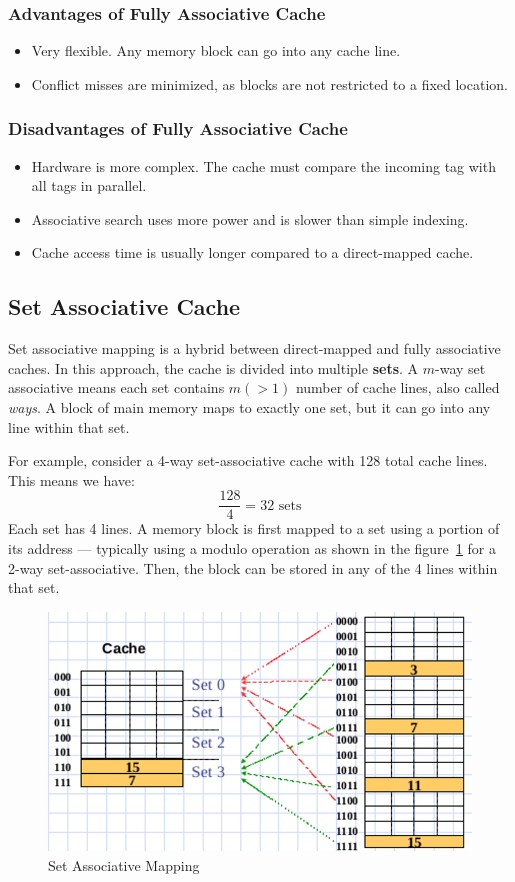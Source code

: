 \documentclass[12pt]{book}
\begin{document}
\subsubsection*{Advantages of Fully Associative Cache}
\begin{itemize}
    \item Very flexible. Any memory block can go into any cache line.
    \item Conflict misses are minimized, as blocks are not restricted to a fixed location.
\end{itemize}

\subsubsection*{Disadvantages of Fully Associative Cache}
\begin{itemize}
    \item Hardware is more complex. The cache must compare the incoming tag with all tags in parallel.
    \item Associative search uses more power and is slower than simple indexing.
    \item Cache access time is usually longer compared to a direct-mapped cache.
\end{itemize}



\subsection{Set Associative Cache}
\label{sec:set-associative-cache}

Set associative mapping is a hybrid between direct-mapped and fully associative caches. In this approach, the cache is divided into multiple \textbf{sets}. A $m$-way set associative means each set contains $m(>1)$ number of cache lines, also called \textit{ways}. A block of main memory maps to exactly one set, but it can go into any line within that set.

For example, consider a 4-way set-associative cache with 128 total cache lines. This means we have:
\[
\frac{128}{4} = 32 \text{ sets}
\]
Each set has 4 lines. A memory block is first mapped to a set using a portion of its address — typically using a modulo operation as shown in the figure~\ref{fig:set_associative} for a 2-way set-associative. Then, the block can be stored in any of the 4 lines within that set.

\begin{figure}[H]
    \centering
    \includegraphics[width=0.5\linewidth]{images/set_associative.png}
    \caption{Set Associative Mapping}
    \label{fig:set_associative}
\end{figure}
\end{document}
